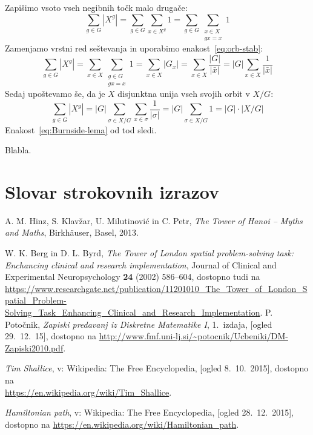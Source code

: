 \documentclass[12pt,a4paper]{amsart}
\theoremstyle{definition} %
\theoremstyle{plain} %
\newcommand{\geslo}[2]{\noindent\textbf{#1}\hspace*{3mm}\hangindent=\parindent\hangafter=1 #2}
\begin{document}
\proof
    Zapišimo vsoto vseh negibnih točk malo drugače:
    \[
        \sum_{g \in G} |X^g| = \sum_{g \in G} \sum_{x \in X^g} 1 = \sum_{g \in G} \sum_{\substack{x \in X \\ gx = x}} 1  
    \]
    Zamenjamo vrstni red seštevanja in uporabimo enakost~\eqref{eq:orb-stab}:
    \[
        \sum_{g \in G} |X^g| = \sum_{x \in X} \sum_{\substack{g \in G \\ gx = x}} 1 = 
        \sum_{x \in X} |G_x| = \sum_{x \in X} \frac{|G|}{|\bar{x}|} = |G| \sum_{x \in X} \frac{1}{|\bar{x}|}
    \]
    Sedaj upoštevamo še, da je $X$ disjunktna unija vseh svojih orbit v $X/G$:
    \[
        \sum_{g \in G} |X^g| = |G| \sum_{\sigma \in X/G} \sum_{x \in \sigma} \frac{1}{|\sigma|} = |G| \sum_{\sigma \in X/G} 1 = |G| \cdot |X/G| 
    \]
    Enakost~\eqref{eq:Burnside-lema} od tod sledi.
\endproof

    Blabla.
\endproof

\section*{Slovar strokovnih izrazov}

%
%

\begin{thebibliography}{99}

 A. M. Hinz, S. Klavžar, U. Milutinović in C. Petr, \emph{The Tower of Hanoi – Myths and Maths}, Birkhäuser, Basel, 2013.

W. K. Berg in D. L. Byrd, \emph{The Tower of London spatial problem-solving task: Enchancing clinical and research implementation}, Journal of Clinical and Experimental Neuropsychology \textbf{24} (2002) 586--604,
dostopno tudi na \\ \url{https://www.researchgate.net/publication/11201010_The_Tower_of_London_Spatial_Problem-Solving_Task_Enhancing_Clinical_and_Research_Implementation}.
 P. Potočnik, \emph{Zapiski predavanj iz Diskretne Matematike I}, 1.~izdaja, [ogled 29.~12.~15], dostopno na \url{http://www.fmf.uni-lj.si/~potocnik/Ucbeniki/DM-Zapiski2010.pdf}.

 \emph{Tim Shallice}, v: Wikipedia: The Free Encyclopedia, [ogled 8.~10.~2015], dostopno na\\ \url{https://en.wikipedia.org/wiki/Tim_Shallice}.

 \emph{Hamiltonian path}, v: Wikipedia: The Free Encyclopedia, [ogled 28.~12.~2015], dostopno na \url{https://en.wikipedia.org/wiki/Hamiltonian_path}.
\end{thebibliography}
\end{document}
